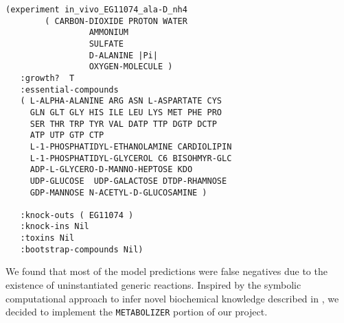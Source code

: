 \begin{lstlisting}[label={listing:biolog-experiments},caption={{\em E. coli} conditional essentiality experiments}]
(experiment in_vivo_EG11074_ala-D_nh4 
	    ( CARBON-DIOXIDE PROTON WATER 
			     AMMONIUM 
			     SULFATE 
			     D-ALANINE |Pi| 
			     OXYGEN-MOLECULE )
   :growth?  T
   :essential-compounds 
   ( L-ALPHA-ALANINE ARG ASN L-ASPARTATE CYS
     GLN GLT GLY HIS ILE LEU LYS MET PHE PRO 
     SER THR TRP TYR VAL DATP TTP DGTP DCTP 
     ATP UTP GTP CTP 
     L-1-PHOSPHATIDYL-ETHANOLAMINE CARDIOLIPIN
     L-1-PHOSPHATIDYL-GLYCEROL C6 BISOHMYR-GLC
     ADP-L-GLYCERO-D-MANNO-HEPTOSE KDO 
     UDP-GLUCOSE  UDP-GALACTOSE DTDP-RHAMNOSE 
     GDP-MANNOSE N-ACETYL-D-GLUCOSAMINE )

   :knock-outs ( EG11074 )
   :knock-ins Nil
   :toxins Nil
   :bootstrap-compounds Nil)

\end{lstlisting}

We found that most of the model predictions were false negatives
due to the existence of uninstantiated generic reactions. Inspired by
the symbolic computational approach to infer novel biochemical
knowledge described in \cite{McShan2004}, we decided to implement the
{\tt METABOLIZER} portion of our project.
